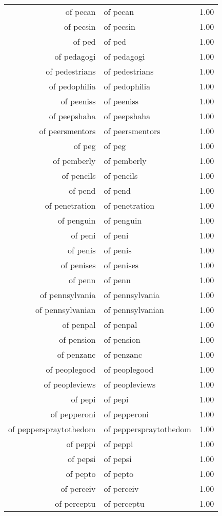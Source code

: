 \begin{table}[ht]
\begin{tabular}{rlr}
  of pecan & of pecan & 1.00 \\ 
  of pecsin & of pecsin & 1.00 \\ 
  of ped & of ped & 1.00 \\ 
  of pedagogi & of pedagogi & 1.00 \\ 
  of pedestrians & of pedestrians & 1.00 \\ 
  of pedophilia & of pedophilia & 1.00 \\ 
  of peeniss & of peeniss & 1.00 \\ 
  of peepshaha & of peepshaha & 1.00 \\ 
  of peersmentors & of peersmentors & 1.00 \\ 
  of peg & of peg & 1.00 \\ 
  of pemberly & of pemberly & 1.00 \\ 
  of pencils & of pencils & 1.00 \\ 
  of pend & of pend & 1.00 \\ 
  of penetration & of penetration & 1.00 \\ 
  of penguin & of penguin & 1.00 \\ 
  of peni & of peni & 1.00 \\ 
  of penis & of penis & 1.00 \\ 
  of penises & of penises & 1.00 \\ 
  of penn & of penn & 1.00 \\ 
  of pennsylvania & of pennsylvania & 1.00 \\ 
  of pennsylvanian & of pennsylvanian & 1.00 \\ 
  of penpal & of penpal & 1.00 \\ 
  of pension & of pension & 1.00 \\ 
  of penzanc & of penzanc & 1.00 \\ 
  of peoplegood & of peoplegood & 1.00 \\ 
  of peopleviews & of peopleviews & 1.00 \\ 
  of pepi & of pepi & 1.00 \\ 
  of pepperoni & of pepperoni & 1.00 \\ 
  of pepperspraytothedom & of pepperspraytothedom & 1.00 \\ 
  of peppi & of peppi & 1.00 \\ 
  of pepsi & of pepsi & 1.00 \\ 
  of pepto & of pepto & 1.00 \\ 
  of perceiv & of perceiv & 1.00 \\ 
  of perceptu & of perceptu & 1.00 \\ 

\end{tabular}
\end{table}
